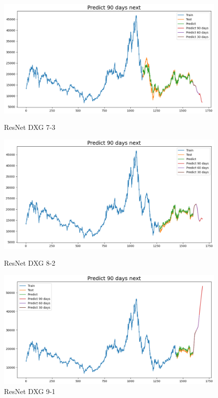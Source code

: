 \documentclass[conference]{IEEEtran}
\begin{document}
\begin{enumerate}
\begin{figure}[htbp]
    \vspace{0.5cm} %

    \begin{minipage}{0.23\textwidth}
    \centering
    \includegraphics[width=1\textwidth]{experiment/resnet/DXG 7_3.png}
    \caption{ResNet DXG 7-3}
    \label{fig:nvl_boxplot}
    \end{minipage}
    \hfill
    \begin{minipage}{0.23\textwidth}
    \centering
    \includegraphics[width=1\textwidth]{experiment/resnet/DXG 8_2.png}
    \caption{ResNet DXG 8-2}
    \label{fig:nvl_histogram}
    \end{minipage}
    \begin{minipage}{0.23\textwidth}
    \centering
    \includegraphics[width=1\textwidth]{experiment/resnet/DXG 9_1.png}
    \caption{ResNet DXG 9-1}
    \label{fig:nvl_histogram}
    \end{minipage}


\end{figure}
\end{enumerate}
\end{document}

